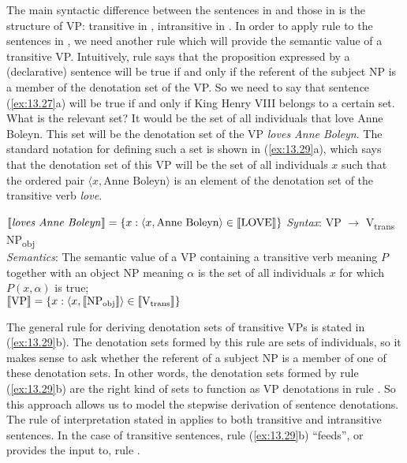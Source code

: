The main syntactic difference between the sentences in  and those in  is the structure of VP: transitive in , intransitive in . In order to apply rule  to the sentences in , we need another rule which will provide the semantic value of a transitive VP. Intuitively, rule  says that the proposition expressed by a (declarative) sentence will be true if and only if the referent of the subject NP is a member of the denotation set of the VP. So we need to say that sentence (\ref{ex:13.27}a) will be true if and only if King Henry VIII belongs to a certain set. What is the relevant set? It would be the set of all individuals that love Anne Boleyn. This set will be the denotation set of the VP \textit{loves Anne Boleyn}. The standard notation for defining such a set is shown in (\ref{ex:13.29}a), which says that the denotation set of this VP will be the set of all individuals $x$ such that the ordered pair $\langle x, \text{Anne Boleyn}\rangle$ is an element of the denotation set of the transitive verb \textit{love}.


\ea \label{ex:13.29}
\ea $\llbracket\text{\textit{loves Anne Boleyn}}\rrbracket  = \{x: \langle x, \text{Anne Boleyn}\rangle \in \llbracket\text{LOVE}\rrbracket \}$
\ex \textit{Syntax}: VP  $\rightarrow$  V\textsubscript{trans}  NP\textsubscript{obj}\\
\textit{Semantics}: The semantic value of a VP containing a transitive verb meaning $P$ together with an object NP meaning $\alpha$ is the set of all individuals $x$ for which $P(x,\alpha)$ is true;\\
{}$\llbracket\text{VP}\rrbracket  =  \{x: \langle x, \llbracket\text{NP\textsubscript{obj}}\rrbracket \rangle \in \llbracket\text{V\textsubscript{trans}}\rrbracket \}$
\z \z


The general rule for deriving denotation sets of transitive VPs is stated in (\ref{ex:13.29}b). The denotation sets formed by this rule are sets of individuals, so it makes sense to ask whether the referent of a subject NP is a member of one of these denotation sets. In other words, the denotation sets formed by rule (\ref{ex:13.29}b) are the right kind of sets to function as VP denotations in rule . So this approach allows us to model the stepwise derivation of sentence denotations. The rule of interpretation stated in  applies to both transitive and intransitive sentences. In the case of transitive sentences, rule (\ref{ex:13.29}b) “feeds”, or provides the input to, rule .



